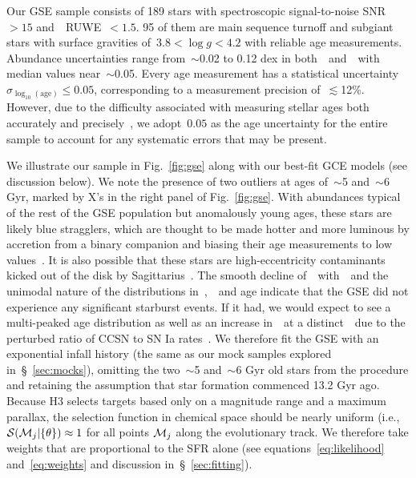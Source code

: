 \documentclass[ms.tex]{subfiles}
\begin{document}
Our GSE sample consists of 189 stars with spectroscopic signal-to-noise
SNR~$> 15$ and~\gaia~RUWE~$< 1.5$.
95 of them are main sequence turnoff and subgiant stars with surface gravities
of~$3.8 < \log g < 4.2$ with reliable age measurements.
Abundance uncertainties range from~$\sim$0.02 to 0.12 dex in
both~\feh~and~\afe~with median values near~$\sim$0.05.
Every age measurement has a statistical uncertainty
$\sigma_{\log_{10}(\text{age})} \leq 0.05$, corresponding to a measurement
precision of~$\lesssim$12\%.
However, due to the difficulty associated with measuring stellar ages both
accurately and precisely~\citep[e.g.,][]{Soderblom2010, Chaplin2013, Angus2019},
we adopt~$0.05$ as the age uncertainty for the entire sample to account for any
systematic errors that may be present.
\par
We illustrate our sample in Fig.~\ref{fig:gse} along with our best-fit GCE
models (see discussion below).
We note the presence of two outliers at ages of~$\sim$5 and~$\sim$6 Gyr, marked
by X's in the right panel of Fig.~\ref{fig:gse}.
With abundances typical of the rest of the GSE population but anomalously young
ages, these stars are likely blue stragglers, which are thought to be made
hotter and more luminous by accretion from a binary companion and biasing their
age measurements to low values~\citep[e.g.,][]{Bond1971, Stryker1993}.
It is also possible that these stars are high-eccentricity contaminants kicked
out of the disk by Sagittarius~\citep[e.g.,][]{Donlon2020}.
The smooth decline of~\afe~with~\feh~and the unimodal nature of the
distributions in~\feh,~\afe~and age indicate that the GSE did not experience
any significant starburst events.
If it had, we would expect to see a multi-peaked age distribution
as well as an increase in~\afe~at a distinct~\feh~due to the perturbed ratio of
CCSN to SN Ia rates~\citep{Johnson2020}.
We therefore fit the GSE with an exponential infall history (the same as our
mock samples explored in~\S~\ref{sec:mocks}), omitting the two~$\sim$5
and~$\sim$6 Gyr old stars from the procedure and retaining the assumption that
star formation commenced 13.2 Gyr ago.
Because H3 selects targets based only on a magnitude range and a maximum
parallax, the selection function in chemical space should be nearly uniform
(i.e.,~$\mathcal{S}(\mathcal{M}_j | \{\theta\}) \approx 1$ for all points
$\mathcal{M}_j$ along the evolutionary track.
We therefore take weights that are proportional to the SFR alone (see
equations~\ref{eq:likelihood} and~\ref{eq:weights} and discussion
in~\S~\ref{sec:fitting}).
\par
\end{document}
